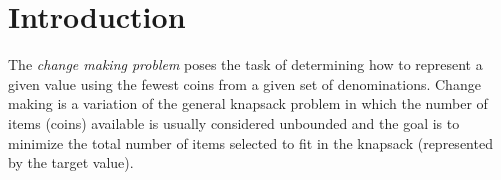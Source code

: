 
\section{Introduction}

The \emph{change making problem} poses the task of determining how to represent a given value using the fewest coins from a given set of denominations. Change making is a variation of the general knapsack problem in which the number of items (coins) available is usually considered unbounded and the goal is to minimize the total number of items selected to fit in the knapsack (represented by the target value).